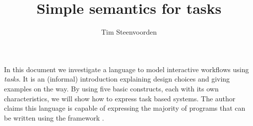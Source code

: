 \documentclass
  [a4paper
  ,justified
  ,nofonts
  ]{tufte-handout}
\begin{document}
\title{Simple semantics for tasks}
\author{Tim Steenvoorden}

\maketitle

In this document we investigate a language to model interactive workflows using \emph{tasks}.
It is an (informal) introduction explaining design choices and giving examples on the way.
By using five basic constructs,
each with its own characteristics,
we will show how to express task based systems.
The author claims this language is capable of expressing the majority of programs that can be written using the \ITASKS framework \cite{conf/pepm/PlasmeijerAKLNG11}.

\tableofcontents
\newpage













\end{document}
